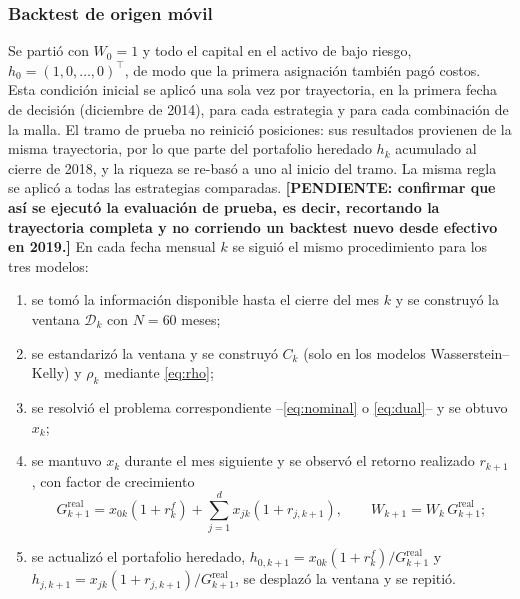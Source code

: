 \subsubsection{Backtest de origen móvil}


Se partió con $W_0=1$ y todo el capital en el activo de bajo riesgo, $h_0=(1,0,\dots,0)^\top$, de modo que la primera asignación también pagó costos. Esta condición inicial se aplicó una sola vez por trayectoria, en la primera fecha de decisión (diciembre de 2014), para cada estrategia y para cada combinación de la malla. El tramo de prueba no reinició posiciones: sus resultados provienen de la misma trayectoria, por lo que parte del portafolio heredado $h_k$ acumulado al cierre de 2018, y la riqueza se re-basó a uno al inicio del tramo. La misma regla se aplicó a todas las estrategias comparadas. \textbf{[PENDIENTE: confirmar que así se ejecutó la evaluación de prueba, es decir, recortando la trayectoria completa y no corriendo un backtest nuevo desde efectivo en 2019.]}
 En cada fecha mensual $k$ se siguió el mismo procedimiento para los tres modelos:
\begin{enumerate}[label=\arabic*.]
    \item se tomó la información disponible hasta el cierre del mes $k$ y se construyó la ventana $\mathcal D_k$ con $N=60$ meses;
    \item se estandarizó la ventana y se construyó $C_k$ (solo en los modelos Wasserstein--Kelly) y $\rho_k$ mediante \eqref{eq:rho};
    \item se resolvió el problema correspondiente --\eqref{eq:nominal} o \eqref{eq:dual}-- y se obtuvo $x_k$;
    \item se mantuvo $x_k$ durante el mes siguiente y se observó el retorno realizado $r_{k+1}$, con factor de crecimiento
    \begin{equation}\label{eq:Greal}
    G^{\mathrm{real}}_{k+1}=x_{0k}(1+r^f_k)+\sum_{j=1}^d x_{jk}(1+r_{j,k+1}),\qquad W_{k+1}=W_k\,G^{\mathrm{real}}_{k+1};
    \end{equation}
    \item se actualizó el portafolio heredado, $h_{0,k+1}=x_{0k}(1+r^f_k)/G^{\mathrm{real}}_{k+1}$ y $h_{j,k+1}=x_{jk}(1+r_{j,k+1})/G^{\mathrm{real}}_{k+1}$, se desplazó la ventana y se repitió.
\end{enumerate}
